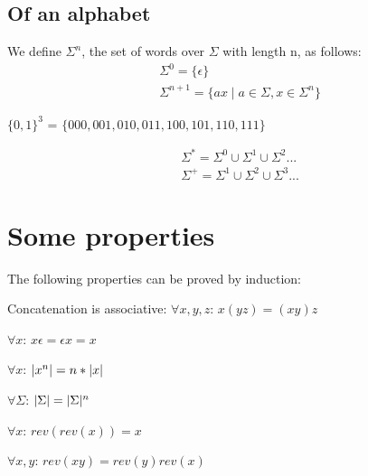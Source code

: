 \subsection{Of an alphabet} %
\label{sub:of_an_alphabet}
\begin{Def}
    We define $\Sigma^n$, the set of words over $\Sigma$ with length n, as follows:
    \begin{align*}
        &\Sigma^0 = \{\epsilon\}\\
        &\Sigma^{n+1} = \{ax \mid a \in \Sigma, x \in \Sigma^n\}
    \end{align*}
\end{Def}
\begin{Ex}
    $\{0,1\}^3$ = $\{000,001,010,011,100,101,110,111\}$
\end{Ex}
\begin{Not}
    \begin{align*}
        &\Sigma^* = \Sigma^0 \cup \Sigma^1 \cup \Sigma^2 ... \\
        &\Sigma^+ = \Sigma^1 \cup \Sigma^2 \cup \Sigma^3 ...
    \end{align*}
\end{Not}

\section{Some properties} %
\label{sec:some_properties}
The following properties can be proved by induction:
\begin{Lem}
    Concatenation is associative: $\forall x,y,z$: $x(yz) = (xy)z$
\end{Lem}
\begin{Lem}
    $\forall x$: $x\epsilon = \epsilon x = x$
\end{Lem}
\begin{Lem}
    $\forall x$: $\lvert x^n\rvert = n * \lvert x\rvert$
\end{Lem}
\begin{Lem}
    $\forall \Sigma$: $\lvert\Sigma\rvert = \lvert\Sigma\rvert^n$
\end{Lem}
\begin{Lem}
    $\forall x$: $rev(rev(x)) = x$
\end{Lem}
\begin{Lem}
    $\forall x,y$: $rev(xy) = rev(y)rev(x)$
\end{Lem}

